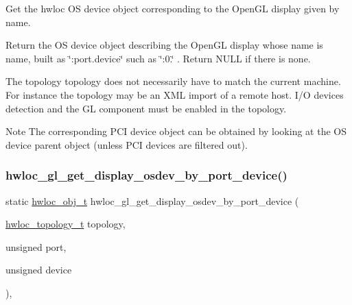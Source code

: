 Get the hwloc OS device object corresponding to the Open\+GL display given by name. 

Return the OS device object describing the Open\+GL display whose name is {\ttfamily name}, built as \char`\"{}\+:port.\+device\char`\"{} such as \char`\"{}\+:0.\char`\"{} . Return N\+U\+LL if there is none.

The topology {\ttfamily topology} does not necessarily have to match the current machine. For instance the topology may be an X\+ML import of a remote host. I/O devices detection and the GL component must be enabled in the topology.

\begin{DoxyNote}{Note}
The corresponding P\+CI device object can be obtained by looking at the OS device parent object (unless P\+CI devices are filtered out). 
\end{DoxyNote}
\mbox{\label{a00223_ga4d66a77e4fe4051d6e5b772c1b8fcec5}} 
\subsubsection{\texorpdfstring{hwloc\+\_\+gl\+\_\+get\+\_\+display\+\_\+osdev\+\_\+by\+\_\+port\+\_\+device()}{hwloc\_gl\_get\_display\_osdev\_by\_port\_device()}}
{\footnotesize\ttfamily static \hyperlink{a00185_ga79b8ab56877ef99ac59b833203391c7d}{hwloc\+\_\+obj\+\_\+t} hwloc\+\_\+gl\+\_\+get\+\_\+display\+\_\+osdev\+\_\+by\+\_\+port\+\_\+device (\begin{DoxyParamCaption}\item[{\hyperlink{a00186_ga9d1e76ee15a7dee158b786c30b6a6e38}{hwloc\+\_\+topology\+\_\+t}}]{topology,  }\item[{unsigned}]{port,  }\item[{unsigned}]{device }\end{DoxyParamCaption})\hspace{0.3cm}{\ttfamily [inline]}, {\ttfamily [static]}}



